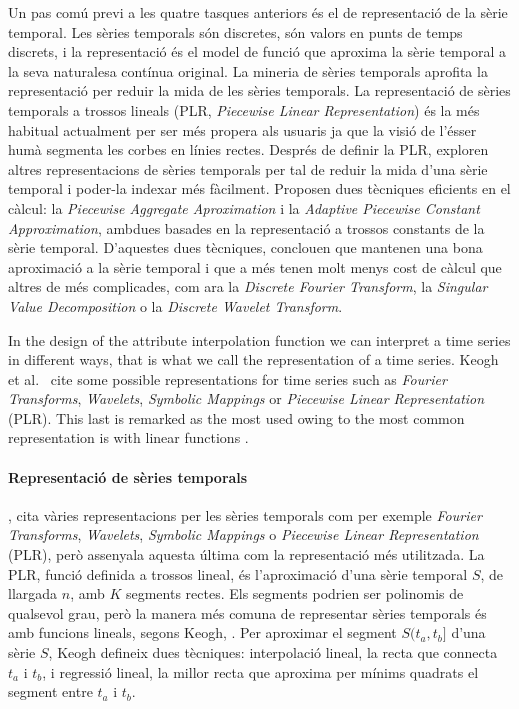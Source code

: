 Un pas comú previ a les quatre tasques anteriors és el de representació de la sèrie temporal. Les sèries temporals són discretes, són valors en punts de temps discrets, i la representació és el model de funció que aproxima la sèrie temporal a la seva naturalesa contínua original. La mineria de sèries temporals aprofita la representació per reduir la mida de les sèries temporals.
La representació de sèries temporals a trossos lineals (PLR, \emph{Piecewise Linear Representation}) \parencite{keogh97,keogh98} {é}s la més habitual actualment per ser més propera als usuaris ja que la visió de l'ésser humà segmenta les corbes en línies rectes.
Després de definir la PLR, \textcite{keogh00,keogh01} exploren altres representacions de sèries temporals per tal de reduir la mida d'una sèrie temporal i poder-la indexar més fàcilment. Proposen dues tècniques eficients en el càlcul: la \emph{Piecewise Aggregate Aproximation} i la \emph{Adaptive Piecewise Constant Approximation}, ambdues basades en la representació a trossos constants de la sèrie temporal. 
D'aquestes dues tècniques, \citeauthor{keogh00,keogh01} conclouen que mantenen una bona aproximació a la sèrie temporal i que a més  tenen molt menys cost de càlcul que altres de més complicades, com ara la \emph{Discrete Fourier Transform},  la  \emph{Singular Value Decomposition} o la \emph{Discrete Wavelet Transform}.




In the design of the attribute interpolation function we can interpret
a time series in different ways, that is what we call the
representation of a time series. Keogh et al.\ \cite{last:keogh} cite
some possible representations for time series such as \emph{Fourier
  Transforms}, \emph{Wavelets}, \emph{Symbolic Mappings} or
\emph{Piecewise Linear Representation} (PLR). This last is remarked as
the most used owing to the most common representation is with linear
functions \cite{keogh01}.

\paragraph{Representació de sèries temporals}

\textcite{last:keogh}, cita vàries representacions per les sèries temporals com per exemple \emph{Fourier Transforms}, \emph{Wavelets}, \emph{Symbolic Mappings} o \emph{Piecewise Linear Representation} (PLR), però assenyala aquesta última com la representació més utilitzada. 
La PLR, funció definida a trossos lineal, és l'aproximació d'una sèrie temporal $S$, de llargada $n$, amb $K$ segments rectes. Els segments podrien ser polinomis de qualsevol grau, però la manera més comuna de representar sèries temporals és amb funcions lineals, segons Keogh, \cite{keogh02}.
Per aproximar el segment $S(t_a,t_b]$ d'una sèrie $S$, Keogh defineix dues tècniques: interpolació lineal, la recta que connecta $t_a$ i $t_b$, i regressió lineal, la millor recta que aproxima per mínims quadrats el segment entre $t_a$ i $t_b$.

